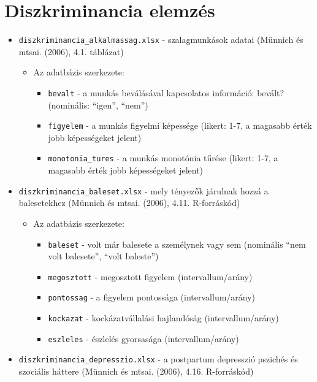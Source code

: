 \documentclass[
  letterpaper,
]{krantz}
\providecommand{\tightlist}{%
  \setlength{\itemsep}{0pt}\setlength{\parskip}{0pt}}\usepackage{longtable,booktabs,array}
\begin{document}
\hypertarget{diszkriminancia-elemzuxe9s}{%
\section{Diszkriminancia elemzés}\label{diszkriminancia-elemzuxe9s}}

\begin{itemize}
\item
  \texttt{diszkriminancia\_alkalmassag.xlsx} - szalagmunkások adatai
  (Münnich és mtsai. (2006), 4.1. táblázat)

  \begin{itemize}
  \item
    Az adatbázis szerkezete:

    \begin{itemize}
    \tightlist
    \item
      \texttt{bevalt} - a munkás beválásával kapcsolatos információ:
      bevált? (nominális: ``igen'', ``nem'')
    \item
      \texttt{figyelem} - a munkás figyelmi képessége (likert: 1-7, a
      magasabb érték jobb képességeket jelent)
    \item
      \texttt{monotonia\_tures} - a munkás monotónia tűrése (likert:
      1-7, a magasabb érték jobb képességeket jelent)
    \end{itemize}
  \end{itemize}
\item
  \texttt{diszkriminancia\_baleset.xlsx} - mely tényezők járulnak hozzá
  a balesetekhez (Münnich és mtsai. (2006), 4.11. R-forráskód)

  \begin{itemize}
  \item
    Az adatbázis szerkezete:

    \begin{itemize}
    \tightlist
    \item
      \texttt{baleset} - volt már balesete a személynek vagy sem
      (nominális ``nem volt balesete'', ``volt baleste'')
    \item
      \texttt{megosztott} - megosztott figyelem (intervallum/arány)
    \item
      \texttt{pontossag} - a figyelem pontossága (intervallum/arány)
    \item
      \texttt{kockazat} - kockázatvállalási hajlandóság
      (intervallum/arány)
    \item
      \texttt{eszleles} - észlelés gyorsasága (intervallum/arány)
    \end{itemize}
  \end{itemize}
\item
  \texttt{diszkriminancia\_depresszio.xlsx} - a postpartum depresszió
  pszichés és szociális háttere (Münnich és mtsai. (2006), 4.16.
  R-forráskód)


\end{itemize}
\end{document}
